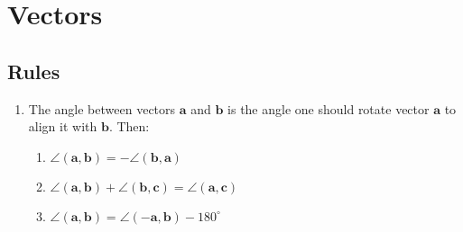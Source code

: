 \documentclass{article}
\begin{document}
\section{Vectors}
\subsection{Rules}
\begin{enumerate}
\item
The angle between vectors $\mathbf{a}$ and $\mathbf{b}$ is the angle one should rotate vector $\mathbf{a}$ to align it with $\mathbf{b}$.
Then:
\begin{enumerate}
\item 	
$\angle (\mathbf{a},\mathbf{b}) = - \angle (\mathbf{b},\mathbf{a})$
\item 
$\angle (\mathbf{a},\mathbf{b}) + \angle (\mathbf{b},\mathbf{c}) = \angle (\mathbf{a},\mathbf{c})$
\item
$\angle (\mathbf{a},\mathbf{b}) = \angle (\mathbf{-a},\mathbf{b}) - 180 ^\circ$
\end{enumerate}


\end{enumerate}
\end{document}
